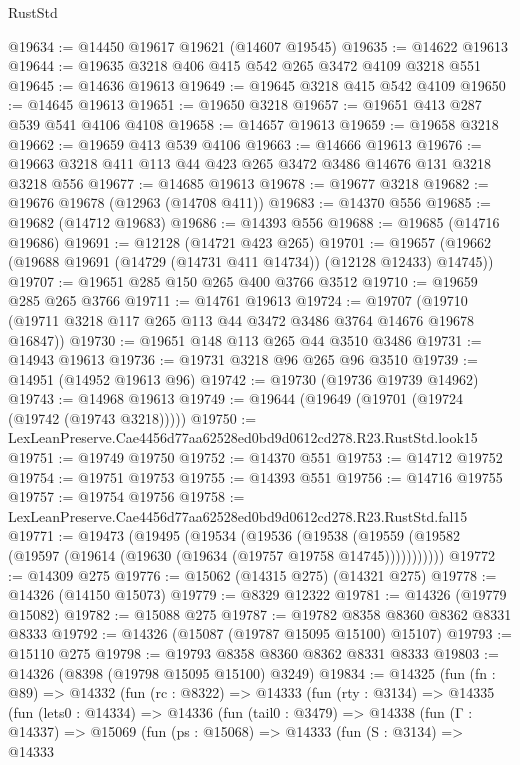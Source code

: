 \begin{lexlean}{RustStd}
\begin{coremodule}
@19634 := @14450 @19617 @19621 (@14607 @19545)
@19635 := @14622 @19613
@19644 := @19635 @3218 @406 @415 @542 @265 @3472 @4109 @3218 @551
@19645 := @14636 @19613
@19649 := @19645 @3218 @415 @542 @4109
@19650 := @14645 @19613
@19651 := @19650 @3218
@19657 := @19651 @413 @287 @539 @541 @4106 @4108
@19658 := @14657 @19613
@19659 := @19658 @3218
@19662 := @19659 @413 @539 @4106
@19663 := @14666 @19613
@19676 := @19663 @3218 @411 @113 @44 @423 @265 @3472 @3486 @14676 @131 @3218 @3218 @556
@19677 := @14685 @19613
@19678 := @19677 @3218
@19682 := @19676 @19678 (@12963 (@14708 @411))
@19683 := @14370 @556
@19685 := @19682 (@14712 @19683)
@19686 := @14393 @556
@19688 := @19685 (@14716 @19686)
@19691 := @12128 (@14721 @423 @265)
@19701 := @19657 (@19662 (@19688 @19691 (@14729 (@14731 @411 @14734)) (@12128 @12433) @14745))
@19707 := @19651 @285 @150 @265 @400 @3766 @3512
@19710 := @19659 @285 @265 @3766
@19711 := @14761 @19613
@19724 := @19707 (@19710 (@19711 @3218 @117 @265 @113 @44 @3472 @3486 @3764 @14676 @19678 @16847))
@19730 := @19651 @148 @113 @265 @44 @3510 @3486
@19731 := @14943 @19613
@19736 := @19731 @3218 @96 @265 @96 @3510
@19739 := @14951 (@14952 @19613 @96)
@19742 := @19730 (@19736 @19739 @14962)
@19743 := @14968 @19613
@19749 := @19644 (@19649 (@19701 (@19724 (@19742 (@19743 @3218)))))
@19750 := LexLeanPreserve.Cae4456d77aa62528ed0bd9d0612cd278.R23.RustStd.look15
@19751 := @19749 @19750
@19752 := @14370 @551
@19753 := @14712 @19752
@19754 := @19751 @19753
@19755 := @14393 @551
@19756 := @14716 @19755
@19757 := @19754 @19756
@19758 := LexLeanPreserve.Cae4456d77aa62528ed0bd9d0612cd278.R23.RustStd.fal15
@19771 := @19473
    (@19495
      (@19534
        (@19536
          (@19538 (@19559 (@19582 (@19597 (@19614 (@19630 (@19634 (@19757 @19758 @14745)))))))))))
@19772 := @14309 @275
@19776 := @15062 (@14315 @275) (@14321 @275)
@19778 := @14326 (@14150 @15073)
@19779 := @8329 @12322
@19781 := @14326 (@19779 @15082)
@19782 := @15088 @275
@19787 := @19782 @8358 @8360 @8362 @8331 @8333
@19792 := @14326 (@15087 (@19787 @15095 @15100) @15107)
@19793 := @15110 @275
@19798 := @19793 @8358 @8360 @8362 @8331 @8333
@19803 := @14326 (@8398 (@19798 @15095 @15100) @3249)
@19834 := @14325
    (fun (fn : @89) =>
    @14332
      (fun (rc : @8322) =>
      @14333
        (fun (rty : @3134) =>
        @14335
          (fun (lets0 : @14334) =>
          @14336
            (fun (tail0 : @3479) =>
            @14338
              (fun (Γ : @14337) =>
              @15069
                (fun (ps : @15068) =>
                @14333
                  (fun (S : @3134) =>
                  @14333

\end{coremodule}
\end{lexlean}
